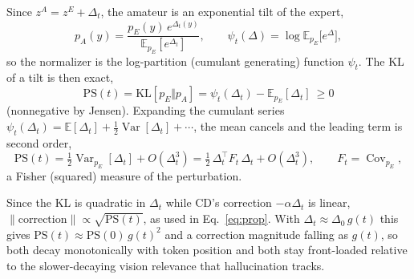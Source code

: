 \documentclass[11pt]{article}
\begin{document}
Since $z^A=z^E+\Delta_t$, the amateur is an exponential tilt of the expert,
\begin{equation}
p_A(y)=\frac{p_E(y)\,e^{\Delta_t(y)}}{\mathbb{E}_{p_E}[e^{\Delta_t}]},
\qquad
\psi_t(\Delta)=\log\mathbb{E}_{p_E}\big[e^{\Delta}\big],
\end{equation}
so the normalizer is the log-partition (cumulant generating) function $\psi_t$. The
KL of a tilt is then exact,
\begin{equation}
\mathrm{PS}(t)=\mathrm{KL}[p_E\Vert p_A]=\psi_t(\Delta_t)-\mathbb{E}_{p_E}[\Delta_t]
\ \ge 0
\end{equation}
(nonnegative by Jensen). Expanding the cumulant series
$\psi_t(\Delta_t)=\mathbb{E}[\Delta_t]+\tfrac12\operatorname{Var}[\Delta_t]+\cdots$,
the mean cancels and the leading term is second order,
\begin{equation}
\mathrm{PS}(t)=\tfrac12\operatorname{Var}_{p_E}[\Delta_t]+O(\Delta_t^3)
             =\tfrac12\,\Delta_t^{\top}F_t\,\Delta_t+O(\Delta_t^3),
\qquad F_t=\operatorname{Cov}_{p_E},
\end{equation}
a Fisher (squared) measure of the perturbation.

Since the KL is quadratic in $\Delta_t$ while CD's correction $-\alpha\Delta_t$ is
linear, $\lVert\text{correction}\rVert\propto\sqrt{\mathrm{PS}(t)}$, as used in
Eq.~\eqref{eq:prop}. With $\Delta_t\approx\Delta_0\,g(t)$ this gives
$\mathrm{PS}(t)\approx\mathrm{PS}(0)\,g(t)^2$ and a correction magnitude falling as
$g(t)$, so both decay monotonically with token position and both stay front-loaded
relative to the slower-decaying vision relevance that hallucination tracks.
\end{document}
